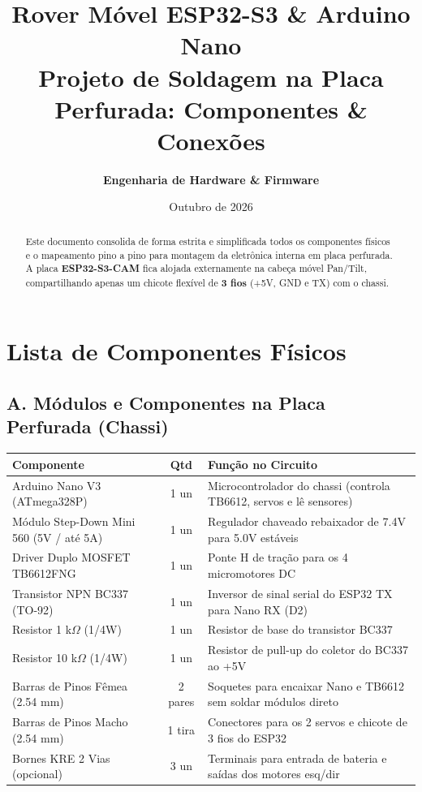 \documentclass[11pt,a4paper]{article}
\title{\textbf{\color{primary}\Huge Rover Móvel ESP32-S3 \& Arduino Nano}\\
\large\color{secondary}Projeto de Soldagem na Placa Perfurada: Componentes \& Conexões}
\author{\textbf{Engenharia de Hardware \& Firmware}}
\date{Outubro de 2026}
\begin{document}
\maketitle

\begin{abstract}
\noindent Este documento consolida de forma estrita e simplificada todos os componentes físicos e o mapeamento pino a pino para montagem da eletrônica interna em placa perfurada. A placa \textbf{ESP32-S3-CAM} fica alojada externamente na cabeça móvel Pan/Tilt, compartilhando apenas um chicote flexível de \textbf{3 fios} (+5V, GND e TX) com o chassi.
\end{abstract}

\vspace{0.5cm}

\section{Lista de Componentes Físicos}

\subsection{A. Módulos e Componentes na Placa Perfurada (Chassi)}

\begin{table}[h!]
\centering
\small
\begin{tabularx}{\textwidth}{p{5.5cm} c X}
\toprule
\rowcolor{tablehead} \color{white}\textbf{Componente} & \color{white}\textbf{Qtd} & \color{white}\textbf{Função no Circuito} \\
\midrule
Arduino Nano V3 (ATmega328P) & 1 un & Microcontrolador do chassi (controla TB6612, servos e lê sensores) \\
\rowcolor{tablezebra} Módulo Step-Down Mini 560 (5V / até 5A) & 1 un & Regulador chaveado rebaixador de 7.4V para 5.0V estáveis \\
Driver Duplo MOSFET TB6612FNG & 1 un & Ponte H de tração para os 4 micromotores DC \\
\rowcolor{tablezebra} Transistor NPN BC337 (TO-92) & 1 un & Inversor de sinal serial do ESP32 TX para Nano RX (D2) \\
Resistor 1 k$\Omega$ (1/4W) & 1 un & Resistor de base do transistor BC337 \\
\rowcolor{tablezebra} Resistor 10 k$\Omega$ (1/4W) & 1 un & Resistor de pull-up do coletor do BC337 ao +5V \\
Barras de Pinos Fêmea (2.54 mm) & 2 pares & Soquetes para encaixar Nano e TB6612 sem soldar módulos direto \\
\rowcolor{tablezebra} Barras de Pinos Macho (2.54 mm) & 1 tira & Conectores para os 2 servos e chicote de 3 fios do ESP32 \\
Bornes KRE 2 Vias (opcional) & 3 un & Terminais para entrada de bateria e saídas dos motores esq/dir \\
\bottomrule
\end{tabularx}
\end{table}
\end{document}
